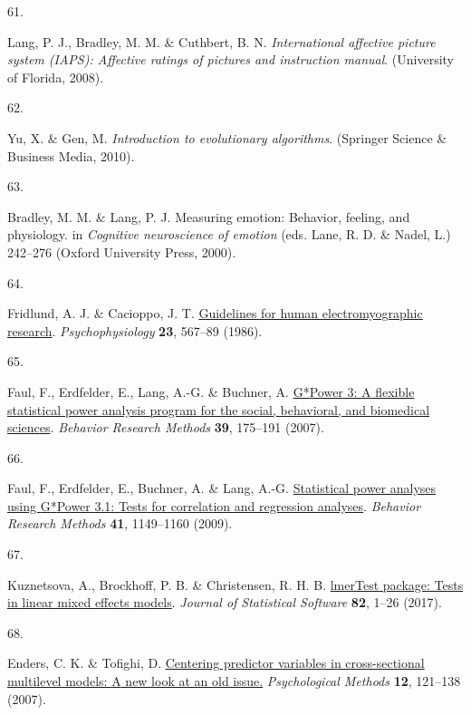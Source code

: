 \documentclass[
  man,floatsintext]{apa6}
\newlength{\cslhangindent}
\newlength{\csllabelwidth}
\newlength{\cslentryspacingunit} %
\newenvironment{CSLReferences}[2] %
 {%
  \setlength{\parindent}{0pt}
  \ifodd #1
  \let\oldpar\par
  \def\par{\hangindent=\cslhangindent\oldpar}
  \fi
  \setlength{\parskip}{#2\cslentryspacingunit}
 }%
 {}
\newcommand{\CSLLeftMargin}[1]{\parbox[t]{\csllabelwidth}{#1}}
\newcommand{\CSLRightInline}[1]{\parbox[t]{\linewidth - \csllabelwidth}{#1}\break}
\begin{document}
\begin{CSLReferences}{0}{0}
\leavevmode{}%
\CSLLeftMargin{61. }%
\CSLRightInline{Lang, P. J., Bradley, M. M. \& Cuthbert, B. N. \emph{International affective picture system (IAPS): Affective ratings of pictures and instruction manual}. (University of Florida, 2008).}

\leavevmode{}%
\CSLLeftMargin{62. }%
\CSLRightInline{Yu, X. \& Gen, M. \emph{Introduction to evolutionary algorithms}. (Springer Science \& Business Media, 2010).}

\leavevmode{}%
\CSLLeftMargin{63. }%
\CSLRightInline{Bradley, M. M. \& Lang, P. J. Measuring emotion: Behavior, feeling, and physiology. in \emph{Cognitive neuroscience of emotion} (eds. Lane, R. D. \& Nadel, L.) 242--276 (Oxford University Press, 2000).}

\leavevmode{}%
\CSLLeftMargin{64. }%
\CSLRightInline{Fridlund, A. J. \& Cacioppo, J. T. \href{https://doi.org/10.1111/j.1469-8986.1986.tb00676.x}{Guidelines for human electromyographic research}. \emph{Psychophysiology} \textbf{23}, 567--89 (1986).}

\leavevmode{}%
\CSLLeftMargin{65. }%
\CSLRightInline{Faul, F., Erdfelder, E., Lang, A.-G. \& Buchner, A. \href{https://doi.org/10.3758/BF03193146}{G*{Power} 3: {A} flexible statistical power analysis program for the social, behavioral, and biomedical sciences}. \emph{Behavior Research Methods} \textbf{39}, 175--191 (2007).}

\leavevmode{}%
\CSLLeftMargin{66. }%
\CSLRightInline{Faul, F., Erdfelder, E., Buchner, A. \& Lang, A.-G. \href{https://doi.org/10.3758/BRM.41.4.1149}{Statistical power analyses using {G}*{Power} 3.1: {Tests} for correlation and regression analyses}. \emph{Behavior Research Methods} \textbf{41}, 1149--1160 (2009).}

\leavevmode{}%
\CSLLeftMargin{67. }%
\CSLRightInline{Kuznetsova, A., Brockhoff, P. B. \& Christensen, R. H. B. \href{https://doi.org/10.18637/jss.v082.i13}{{lmerTest} package: Tests in linear mixed effects models}. \emph{Journal of Statistical Software} \textbf{82}, 1--26 (2017).}

\leavevmode{}%
\CSLLeftMargin{68. }%
\CSLRightInline{Enders, C. K. \& Tofighi, D. \href{https://doi.org/10.1037/1082-989x.12.2.121}{Centering predictor variables in cross-sectional multilevel models: {A} new look at an old issue.} \emph{Psychological Methods} \textbf{12}, 121--138 (2007).}


\end{CSLReferences}
\end{document}
